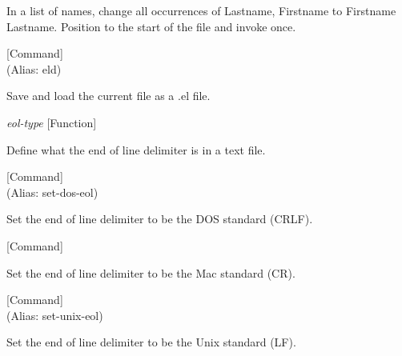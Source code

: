 \begin{doc-string}
In a list of names, change all occurrences
of Lastname, Firstname to Firstname Lastname.
Position to the start of the file and invoke once.
\end{doc-string}

\vspace{1em}
\noindent
{}
\usebox{\funcname}
 \hfill [Command]\\%
 (Alias: eld)

\begin{doc-string}
Save and load the current file as a .el file.
\end{doc-string}

\vspace{1em}
\noindent
{}
\usebox{\funcname}\emph{eol-type}
 \hfill [Function]

\begin{doc-string}
Define what the end of line delimiter is in a text file.
\end{doc-string}

\vspace{1em}
\noindent
{}
\usebox{\funcname}
 \hfill [Command]\\%
 (Alias: set-dos-eol)

\begin{doc-string}
Set the end of line delimiter to be the DOS standard (CRLF).
\end{doc-string}

\vspace{1em}
\noindent
{}
\usebox{\funcname}
 \hfill [Command]

\begin{doc-string}
Set the end of line delimiter to be the Mac standard (CR).
\end{doc-string}

\vspace{1em}
\noindent
{}
\usebox{\funcname}
 \hfill [Command]\\%
 (Alias: set-unix-eol)

\begin{doc-string}
Set the end of line delimiter to be the Unix standard (LF).
\end{doc-string}

